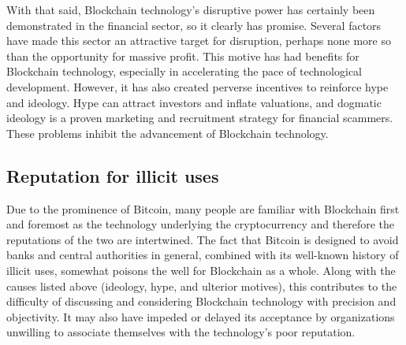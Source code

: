 With that said, Blockchain technology's disruptive power has certainly been demonstrated in the financial sector, so it clearly has promise. Several factors have made this sector an attractive target for disruption, perhaps none more so than the opportunity for massive profit. This motive has had benefits for Blockchain technology, especially in accelerating the pace of technological development. However, it has also created perverse incentives to reinforce hype and ideology. Hype can attract investors and inflate valuations, and dogmatic ideology is a proven marketing and recruitment strategy for financial scammers. These problems inhibit the advancement of Blockchain technology.

\subsection{Reputation for illicit uses}
Due to the prominence of Bitcoin, many people are familiar with Blockchain first and foremost as the technology underlying the cryptocurrency and therefore the reputations of the two are intertwined. The fact that Bitcoin is designed to avoid banks and central authorities in general, combined with its well-known history of illicit uses, somewhat poisons the well for Blockchain as a whole. Along with the causes listed above (ideology, hype, and ulterior motives), this contributes to the difficulty of discussing and considering Blockchain technology with precision and objectivity. It may also have impeded or delayed its acceptance by organizations unwilling to associate themselves with the technology's poor reputation.



